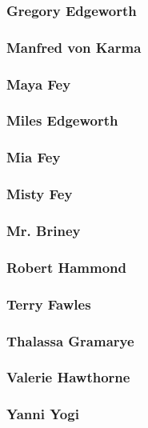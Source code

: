 \subsubsection{Gregory Edgeworth}
\label{people:gregory}

\subsubsection{Manfred von Karma}
\label{people:mvonkarma}

\subsubsection{Maya Fey}
\label{people:mayafey}

\subsubsection{Miles Edgeworth}
\label{people:miles}

\subsubsection{Mia Fey}
\label{people:miafey}

\subsubsection{Misty Fey}
\label{people:mistyfey}

\subsubsection{Mr. Briney}
\label{people:briney}

\subsubsection{Robert Hammond}
\label{people:hammond}

\subsubsection{Terry Fawles}
\label{people:fawles}

\subsubsection{Thalassa Gramarye}
\label{people:thalassa}

\subsubsection{Valerie Hawthorne}
\label{people:valerie}

\subsubsection{Yanni Yogi}
\label{people:yogi}
